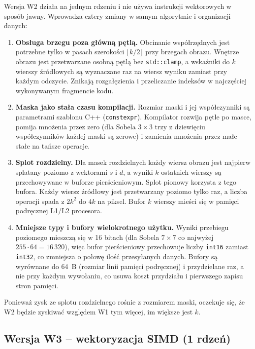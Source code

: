 \documentclass[12pt,a4paper]{article}
\newcommand{\kod}[1]{\texttt{#1}}
\begin{document}
Wersja W2 działa na jednym rdzeniu i nie używa instrukcji wektorowych w sposób jawny. Wprowadza cztery zmiany w samym algorytmie i organizacji danych:
\begin{enumerate}
	\item \textbf{Obsługa brzegu poza główną pętlą.} Obcinanie współrzędnych jest potrzebne tylko w pasach szerokości $\lfloor k/2 \rfloor$ przy brzegach obrazu. Wnętrze obrazu jest przetwarzane osobną pętlą bez \kod{std::clamp}, a wskaźniki do $k$ wierszy źródłowych są wyznaczane raz na wiersz wyniku zamiast przy każdym odczycie. Znikają rozgałęzienia i przeliczanie indeksów w najczęściej wykonywanym fragmencie kodu.
	\item \textbf{Maska jako stała czasu kompilacji.} Rozmiar maski i jej współczynniki są parametrami szablonu C++ (\kod{constexpr}). Kompilator rozwija pętle po masce, pomija mnożenia przez zero (dla Sobela $3\times3$ trzy z dziewięciu współczynników każdej maski są zerowe) i zamienia mnożenia przez małe stałe na tańsze operacje.
	\item \textbf{Splot rozdzielny.} Dla masek rozdzielnych każdy wiersz obrazu jest najpierw splatany poziomo z wektorami $s$ i $d$, a wyniki $k$ ostatnich wierszy są przechowywane w buforze pierścieniowym. Splot pionowy korzysta z tego bufora. Każdy wiersz źródłowy jest przetwarzany poziomo tylko raz, a liczba operacji spada z $2k^2$ do $4k$ na piksel. Bufor $k$ wierszy mieści się w pamięci podręcznej L1/L2 procesora.
	\item \textbf{Mniejsze typy i bufory wielokrotnego użytku.} Wyniki przebiegu poziomego mieszczą się w 16 bitach (dla Sobela $7\times7$ co najwyżej $255 \cdot 64 = 16\,320$), więc bufor pierścieniowy przechowuje liczby \kod{int16} zamiast \kod{int32}, co zmniejsza o połowę ilość przesyłanych danych. Bufory są wyrównane do 64~B (rozmiar linii pamięci podręcznej) i przydzielane raz, a nie przy każdym wywołaniu, co usuwa koszt przydziału i pierwszego zapisu stron pamięci.
\end{enumerate}
Ponieważ zysk ze splotu rozdzielnego rośnie z rozmiarem maski, oczekuje się, że W2 będzie zyskiwać względem W1 tym więcej, im większe jest $k$.

\subsection{Wersja W3 -- wektoryzacja SIMD (1 rdzeń)}
\end{document}
